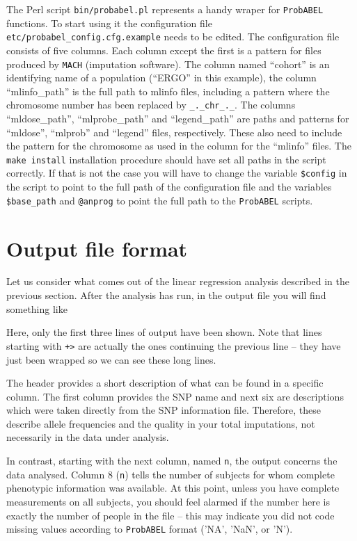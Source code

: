\documentclass[12pt,a4paper]{article}
\newcommand{\PA}{\texttt{ProbABEL}}
\begin{document}
The Perl script \texttt{bin/probabel.pl} represents a handy wraper for
\PA{} functions.  To start using it the configuration file
\texttt{etc/probabel\_config.cfg.example} needs to be edited. The
configuration file consists of five columns. Each column except the
first is a pattern for files produced by \texttt{MACH} (imputation
software). The column named ``cohort'' is an identifying name of a
population (``ERGO'' in this example), the column ``mlinfo\_path'' is
the full path to mlinfo files, including a pattern where the
chromosome number has been replaced by \texttt{\_.\_chr\_.\_}. The
columns ``mldose\_path'', ``mlprobe\_path'' and ``legend\_path'' are
paths and patterns for ``mldose'', ``mlprob'' and ``legend'' files,
respectively. These also need to include the pattern for the
chromosome as used in the column for the ``mlinfo'' files. The
\texttt{make install} installation procedure should have set all paths
in the script correctly. If that is not the case you will have to
change the variable \texttt{\$config} in the script to point to the
full path of the configuration file and the variables
\texttt{\$base\_path} and \texttt{@anprog} to point the full path to
the \PA{} scripts.


\section{Output file format}
Let us consider what comes out of the linear regression analysis
described in the previous section. After the analysis has run, in
the output file you will find something like
\begin{small}

\end{small}

Here, only the first three lines of output have been shown. Note that lines
starting with \texttt{+>} are actually the ones continuing the
previous line -- they have just been wrapped so we can see
these long lines.

The header provides a short description of what can be found in a
specific column. The first column provides the SNP name and
next six are descriptions which were taken directly from the
SNP information file. Therefore, these describe allele frequencies and
the quality in your total imputations, not necessarily in the data under
analysis.

In contrast, starting with the next column, named \texttt{n},
the output concerns the data analysed. Column 8 (\texttt{n}) tells the
number of subjects for whom complete phenotypic information was
available. At this point, unless you have complete measurements on all
subjects, you should feel alarmed if the number here is exactly the
number of people in the file -- this may indicate you did not code
missing values according to \PA{} format ('NA', 'NaN', or 'N').
\end{document}
